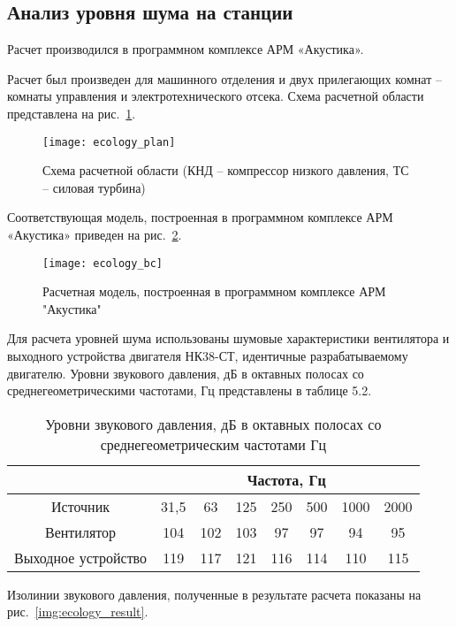 \subsection{Анализ уровня шума на станции} %
\label{sub:ecology_noise_analisys}

Расчет производился в программном комплексе АРМ «Акустика».

Расчет был произведен для машинного отделения и двух прилегающих комнат – комнаты управления и электротехнического отсека.
Схема расчетной области представлена на рис.~\ref{img:ecology_plan}.

\begin{figure}[H]
	\centering
	\texttt{[image: ecology\_plan]}
	\caption{Схема расчетной области (КНД – компрессор низкого давления, ТС – силовая турбина)}
	\label{img:ecology_plan}
\end{figure}

Соответствующая модель, построенная в программном комплексе АРМ «Акустика» приведен на рис.~\ref{img:ecology_bc}.

\begin{figure}[H]
	\centering
	\texttt{[image: ecology\_bc]}
	\caption{Расчетная модель, построенная в программном комплексе АРМ "Акустика"}
	\label{img:ecology_bc}
\end{figure}

Для расчета уровней шума использованы шумовые характеристики вентилятора и выходного устройства двигателя НК38-СТ,
идентичные разрабатываемому двигателю. Уровни звукового давления, дБ в октавных полосах со среднегеометрическими частотами, Гц  представлены в таблице 5.2.

\pagebreak
\begin{samepage}
	\begin{longtable}{|c|c|c|c|c|c|c|c|}
		\caption{Уровни звукового давления, дБ в октавных полосах со среднегеометрическим частотами Гц} \label{tab:ecology_noise_power}
		\hline
		\multicolumn{1}{|c}{}& \multicolumn{7}{c|}{Частота, Гц} \\ \hline
		Источник & 31,5 & 63 & 125 & 250 & 500 & 1000 & 2000 \\ \hline
		Вентилятор & 104 & 102 & 103 & 97 & 97 & 94 & 95 \\ \hline
		Выходное устройство & 119 & 117 & 121 & 116 & 114 & 110 & 115 \\ \hline
		\end{longtable}
\end{samepage}

Изолинии звукового давления, полученные в результате расчета показаны на рис.~\ref{img:ecology_result}.

